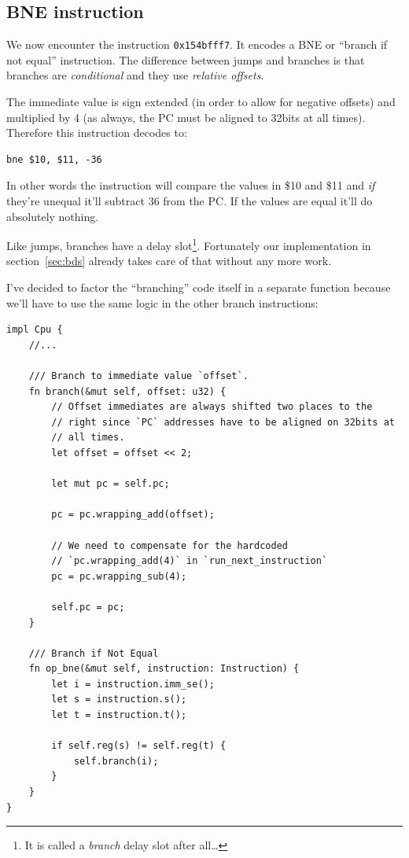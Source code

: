 \documentclass[a4paper]{article}
\newcommand{\code}[1] {\texttt{#1}}
\begin{document}
\subsection{BNE instruction}

We now encounter the instruction \code{0x154bfff7}. It encodes a BNE
or ``branch if not equal'' instruction. The difference between jumps
and branches is that branches are \emph{conditional} and they use
\emph{relative offsets}.

The immediate value is sign extended (in order to allow for negative
offsets) and multiplied by 4 (as always, the PC must be aligned to
32bits at all times). Therefore this instruction decodes to:

\begin{lstlisting}[language=assembly]
bne $10, $11, -36
\end{lstlisting}

In other words the instruction will compare the values in \$10 and
\$11 and \emph{if} they're unequal it'll subtract 36 from the
PC. If the values are equal it'll do absolutely nothing.

Like jumps, branches have a delay slot\footnote{It is called a
  \emph{branch} delay slot after all\dots}. Fortunately our
implementation in section~\ref{sec:bds} already takes care of that
without any more work.

I've decided to factor the ``branching'' code itself in a separate
function because we'll have to use the same logic in the other branch
instructions:

\begin{lstlisting}
impl Cpu {
    //...

    /// Branch to immediate value `offset`.
    fn branch(&mut self, offset: u32) {
        // Offset immediates are always shifted two places to the
        // right since `PC` addresses have to be aligned on 32bits at
        // all times.
        let offset = offset << 2;

        let mut pc = self.pc;

        pc = pc.wrapping_add(offset);

        // We need to compensate for the hardcoded
        // `pc.wrapping_add(4)` in `run_next_instruction`
        pc = pc.wrapping_sub(4);

        self.pc = pc;
    }

    /// Branch if Not Equal
    fn op_bne(&mut self, instruction: Instruction) {
        let i = instruction.imm_se();
        let s = instruction.s();
        let t = instruction.t();

        if self.reg(s) != self.reg(t) {
            self.branch(i);
        }
    }
}
\end{lstlisting}
\end{document}
